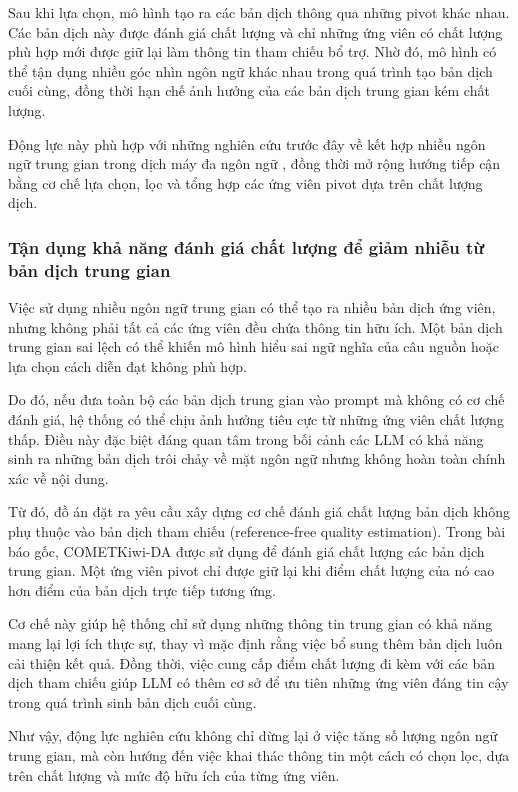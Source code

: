 Sau khi lựa chọn, mô hình tạo ra các bản dịch thông qua những pivot khác nhau. Các bản dịch này được đánh giá chất lượng và chỉ những ứng viên có chất lượng phù hợp mới được giữ lại làm thông tin tham chiếu bổ trợ. Nhờ đó, mô hình có thể tận dụng nhiều góc nhìn ngôn ngữ khác nhau trong quá trình tạo bản dịch cuối cùng, đồng thời hạn chế ảnh hưởng của các bản dịch trung gian kém chất lượng.

Động lực này phù hợp với những nghiên cứu trước đây về kết hợp nhiều ngôn ngữ trung gian trong dịch máy đa ngôn ngữ \cite{mohammadshahi-etal-2024-investigating}, đồng thời mở rộng hướng tiếp cận bằng cơ chế lựa chọn, lọc và tổng hợp các ứng viên pivot dựa trên chất lượng dịch.

\subsubsection{Tận dụng khả năng đánh giá chất lượng để giảm nhiễu từ bản dịch trung gian}

Việc sử dụng nhiều ngôn ngữ trung gian có thể tạo ra nhiều bản dịch ứng viên, nhưng không phải tất cả các ứng viên đều chứa thông tin hữu ích. Một bản dịch trung gian sai lệch có thể khiến mô hình hiểu sai ngữ nghĩa của câu nguồn hoặc lựa chọn cách diễn đạt không phù hợp.

Do đó, nếu đưa toàn bộ các bản dịch trung gian vào prompt mà không có cơ chế đánh giá, hệ thống có thể chịu ảnh hưởng tiêu cực từ những ứng viên chất lượng thấp. Điều này đặc biệt đáng quan tâm trong bối cảnh các LLM có khả năng sinh ra những bản dịch trôi chảy về mặt ngôn ngữ nhưng không hoàn toàn chính xác về nội dung.

Từ đó, đồ án đặt ra yêu cầu xây dựng cơ chế đánh giá chất lượng bản dịch không phụ thuộc vào bản dịch tham chiếu (reference-free quality estimation). Trong bài báo gốc, COMETKiwi-DA được sử dụng để đánh giá chất lượng các bản dịch trung gian. Một ứng viên pivot chỉ được giữ lại khi điểm chất lượng của nó cao hơn điểm của bản dịch trực tiếp tương ứng.

Cơ chế này giúp hệ thống chỉ sử dụng những thông tin trung gian có khả năng mang lại lợi ích thực sự, thay vì mặc định rằng việc bổ sung thêm bản dịch luôn cải thiện kết quả. Đồng thời, việc cung cấp điểm chất lượng đi kèm với các bản dịch tham chiếu giúp LLM có thêm cơ sở để ưu tiên những ứng viên đáng tin cậy trong quá trình sinh bản dịch cuối cùng.

Như vậy, động lực nghiên cứu không chỉ dừng lại ở việc tăng số lượng ngôn ngữ trung gian, mà còn hướng đến việc khai thác thông tin một cách có chọn lọc, dựa trên chất lượng và mức độ hữu ích của từng ứng viên.

